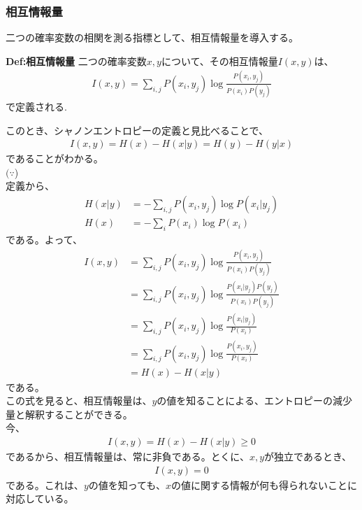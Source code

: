 \documentclass[a4paper,11pt]{jsarticle}
\numberwithin{equation}{section}
\begin{document}
\subsubsection{相互情報量}
二つの確率変数の相関を測る指標として、相互情報量を導入する。\\
\begin{itembox}[l]{\textbf{Def:相互情報量}}
    二つの確率変数$x,y$について、その相互情報量$I(x,y)$は、
    \begin{align}
        I(x,y) = \sum_{i,j}P(x_i,y_j)\log\frac{P(x_i,y_j)}{P(x_i)P(y_j)}
    \end{align}
    で定義される.

\end{itembox}
このとき、シャノンエントロピーの定義と見比べることで、
\begin{align}
    I(x,y) = H(x) - H(x|y) = H(y) - H(y|x)
\end{align}
であることがわかる。\\%
$(\because$)\\
定義から、
\begin{align}
    H(x|y) &= -\sum_{i,j}P(x_i,y_j)\log P(x_i|y_j) \\
    H(x) &= -\sum_{i}P(x_i)\log P(x_i)
\end{align}
である。よって、
\begin{align}
    I(x,y) &= \sum_{i,j}P(x_i,y_j)\log\frac{P(x_i,y_j)}{P(x_i)P(y_j)} \\
    &= \sum_{i,j}P(x_i,y_j)\log \frac{P(x_i|y_j)P(y_j)}{P(x_i)P(y_j)} \\
    &= \sum_{i,j}P(x_i,y_j)\log \frac{P(x_i|y_j)}{P(x_i)} \\
    &= \sum_{i,j}P(x_i,y_j)\log \frac{P(x_i,y_j)}{P(x_i)} \\
    &= H(x) - H(x|y)
\end{align}
である。\hfill\qedsymbol\\
この式を見ると、相互情報量は、$y$の値を知ることによる、エントロピーの減少量と解釈することができる。\\
今、
\begin{align}
    I(x,y) = H(x) - H(x|y) \geq 0
\end{align}
であるから、相互情報量は、常に非負である。とくに、$x,y$が独立であるとき、
\begin{align}
    I(x,y) = 0
\end{align}
である。これは、$y$の値を知っても、$x$の値に関する情報が何も得られないことに対応している。\\
\end{document}

